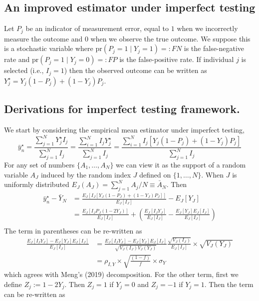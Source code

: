 \documentclass[12pt]{amsart}
\numberwithin{equation}{section}
\theoremstyle{plain}
\def\pr{\text{pr}}
\begin{document}
\subsection{An improved estimator under imperfect testing}


Let $P_j$ be an indicator of measurement error, equal to $1$ when we incorrectly measure the outcome and $0$ when we observe the true outcome. We suppose this is a stochastic variable where $\pr(P_j = 1 \mid Y_j = 1) =: FN$ is the false-negative rate and $\pr(P_j = 1 \mid Y_j = 0) =: FP$ is the false-positive rate.  If individual $j$ is selected (i.e., $I_j = 1$) then the observed outcome can be written as $Y_j^{\star} = Y_j(1-P_j) + (1-Y_j) P_j$.

\subsection{Derivations for imperfect testing framework.}
\label{app:imperfect}
We start by considering the empirical mean estimator under imperfect testing,
$$
\bar y_n^\star = \frac{\sum_{j=1}^N Y_j^\star I_j}{\sum_{j=1}^N I_j} = \frac{\sum_{i=1}^N  I_j Y_j^\star }{\sum_{j=1}^N  I_j } = \frac{\sum_{i=1}^N  I_j \left[ Y_j (1-P_j) + (1-Y_j) P_j \right]}{\sum_{j=1}^N  I_j }
$$
For any set of numbers $\{ A_1, \ldots, A_N \}$ we can view it as the support of a random variable $A_J$ induced by the random index $J$ defined on $\{1,\ldots, N\}$.  When $J$ is uniformly distributed $E_J (A_J) = \sum_{j=1}^N A_j / N \equiv \bar A_N$. Then
$$
\begin{aligned}
\bar y_n^\star  - \bar Y_N &= \frac{E_J \left[ I_J \left[ Y_J (1-P_J) + (1-Y_J) P_J \right] \right]}{E_J [ I_J ] } - E_J[Y_J] \\
&= \frac{E_J \left[ I_J P_J (1-2Y_J) \right]}{E_J [ I_J ] } + \left( \frac{E_J [I_J Y_J]}{E_J [ I_J ] } - \frac{E_J[Y_J] E_J[I_J]}{E_J[I_J]} \right) \\
\end{aligned}
$$
The term in parentheses can be re-written as
$$
\begin{aligned}
\frac{E_J [I_J Y_J]- E_J[Y_J] E_J[I_J]}{E_J[I_J]} &=  \frac{E_J [I_J Y_J]- E_J[Y_J] E_J[I_J]}{\sqrt{V_J(I_J) V_J(Y_J)}} \frac{\sqrt{V_J(I_J)}}{E_J[I_J]} \times \sqrt{V_J(Y_J)} \\
&= \rho_{I,Y} \times \sqrt{\frac{(1-f)}{f}} \times \sigma_Y
\end{aligned}
$$
which agrees with Meng's (2019) decomposition. For the other term, first we define $Z_j := 1 - 2 Y_j $. Then $Z_j = 1$ if $Y_j = 0$ and $Z_j = -1$ if $Y_j = 1$. Then the term can be re-written as
\end{document}
